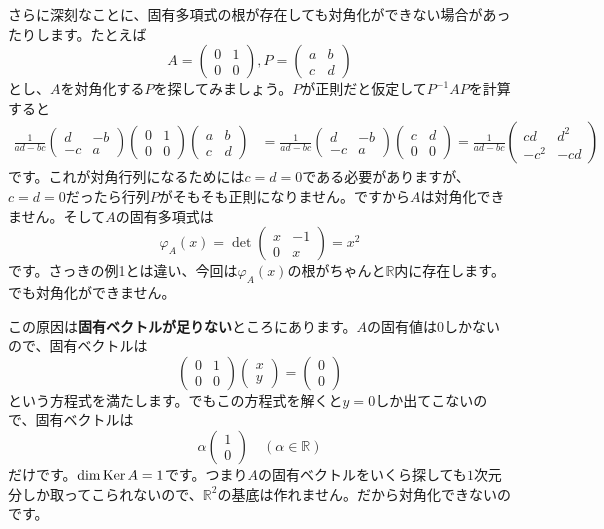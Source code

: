 さらに深刻なことに、固有多項式の根が存在しても対角化ができない場合があったりします。たとえば
\[
A =
\begin{pmatrix}
0 & 1 \\
0 & 0
\end{pmatrix}, 
P = 
\begin{pmatrix}
a & b \\
c & d
\end{pmatrix}
\]
とし、$A$を対角化する$P$を探してみましょう。$P$が正則だと仮定して$P^{-1} A P$を計算すると
\begin{align*}
\frac{1}{ad - bc}
\begin{pmatrix}
d & -b \\
-c & a
\end{pmatrix}
\begin{pmatrix}
0 & 1 \\
0 & 0
\end{pmatrix}
\begin{pmatrix}
a & b \\
c & d
\end{pmatrix}
&=
\frac{1}{ad - bc}
\begin{pmatrix}
d & -b \\
-c & a
\end{pmatrix}
\begin{pmatrix}
c & d \\
0 & 0
\end{pmatrix}
=
\frac{1}{ad - bc}
\begin{pmatrix}
cd & d^2 \\
-c^2 & -cd
\end{pmatrix}
\end{align*}
です。これが対角行列になるためには$c = d = 0$である必要がありますが、$c = d = 0$だったら行列$P$がそもそも正則になりません。ですから$A$は対角化できません。そして$A$の固有多項式は
\[
\varphi_A(x)
=
\det
\begin{pmatrix}
x & -1 \\
0 & x
\end{pmatrix}
= x^2
\]
です。さっきの例1とは違い、今回は$\varphi_A(x)$の根がちゃんと$\mathbb{R}$内に存在します。でも対角化ができません。

この原因は\textbf{固有ベクトルが足りない}ところにあります。$A$の固有値は$0$しかないので、固有ベクトルは
\[
\begin{pmatrix}
0 & 1 \\
0 & 0
\end{pmatrix}
\begin{pmatrix}
x \\
y
\end{pmatrix}
=
\begin{pmatrix}
0 \\
0
\end{pmatrix}
\]
という方程式を満たします。でもこの方程式を解くと$y = 0$しか出てこないので、固有ベクトルは
\[
\alpha
\begin{pmatrix}
1 \\
0
\end{pmatrix} \quad (\alpha \in \mathbb{R})
\]
だけです。$\dim \operatorname{Ker} A = 1$です。つまり$A$の固有ベクトルをいくら探しても$1$次元分しか取ってこられないので、$\mathbb{R}^2$の基底は作れません。だから対角化できないのです。

